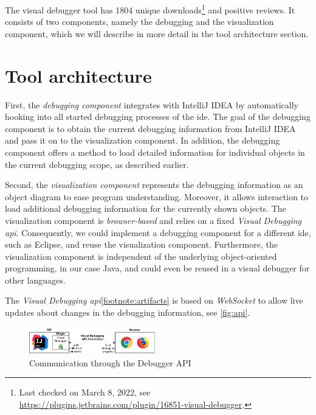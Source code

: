 \documentclass[conference]{IEEEtran}
\newcommand{\intellij}{IntelliJ IDEA}
\begin{document}

The visual debugger tool has 1804 unique downloads\footnote{\label{footnote:pluginStats}Last checked on March 8, 2022, see \url{https://plugins.jetbrains.com/plugin/16851-visual-debugger}.} and positive reviews.
It consists of two components, namely the debugging and the visualization component, which we will describe in more detail in the tool architecture section.

\section{Tool architecture}  \label{sec:architecture}
First, the \textit{debugging component} integrates with \intellij{} by automatically hooking into all started debugging processes of the \gls*{ide}.
The goal of the debugging component is to obtain the current debugging information from \intellij{} and pass it on to the visualization component.
In addition, the debugging component offers a method to load detailed information for individual objects in the current debugging scope, as described earlier.

Second, the \textit{visualization component} represents the debugging information as an object diagram to ease program understanding.
Moreover, it allows interaction to load additional debugging information for the currently shown objects.
The visualization component is \emph{browser-based} and relies on a fixed \emph{Visual Debugging \gls*{api}}.
Consequently, we could implement a debugging component for a different \gls*{ide}, such as Eclipse, and reuse the visualization component.
Furthermore, the visualization component is independent of the underlying object-oriented programming, in our case Java, and could even be reused in a visual debugger for other  languages.

The \textit{Visual Debugging \gls*{api}}\cref{footnote:artifacts} is based on \emph{WebSocket} to allow live updates about changes in the debugging information, see \autoref{fig:api}.

\begin{figure}[h]
    \centering
    \includegraphics[width=0.488\textwidth]{images/VD-architecture.pdf}
    \caption{Communication through the Debugger API}
    \label{fig:api}
\end{figure}
\end{document}
